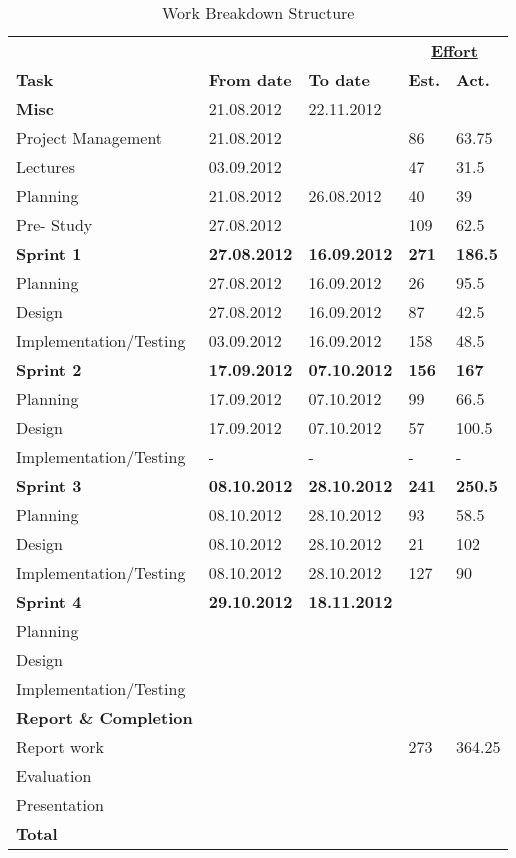 

\begin{table}


\begin{tabular}{ l|l|l|l|l } \hline
&	 &	 &\multicolumn{2}{c}{\underline{\textbf{Effort}}}	 \\
\textbf{Task}	 & \textbf{From date}	 & \textbf{To date}	 & \textbf{Est.} & \textbf{Act.}	 \\ \hline \hline
\textbf{Misc} & 21.08.2012 & 22.11.2012 & & \\ \hline
Project Management & 21.08.2012 & & 86 & 63.75 \\
Lectures & 03.09.2012 & & 47 & 31.5\\
Planning & 21.08.2012 & 26.08.2012 & 40 & 39 \\
Pre- Study &27.08.2012  & & 109 & 62.5\\ \hline
\bf{Sprint 1}	&\bf{27.08.2012} & \bf{16.09.2012} & \bf{271} & \textbf{186.5} \\ \hline
Planning & 27.08.2012 & 16.09.2012 & 26 & 95.5 \\
Design & 27.08.2012 & 16.09.2012 & 87 & 42.5\\
Implementation/Testing & 03.09.2012 & 16.09.2012 & 158 & 48.5\\ \hline
\bf{Sprint 2} & \bf{17.09.2012} & \bf{07.10.2012} & \bf{156} & \textbf{167} \\ \hline
Planning & 17.09.2012 & 07.10.2012 & 99 & 66.5\\
Design& 17.09.2012 & 07.10.2012 & 57 & 100.5\\
Implementation/Testing & - & - & - & -\\ \hline
\bf{Sprint 3}	 & \bf{08.10.2012} & \bf{28.10.2012} & \bf{241} & \textbf{250.5}\\ \hline
Planning & 08.10.2012 & 28.10.2012 & 93 & 58.5 \\
Design & 08.10.2012 & 28.10.2012 & 21 & 102\\
Implementation/Testing & 08.10.2012 & 28.10.2012 & 127 & 90\\ \hline
\bf{Sprint 4}	& \bf{29.10.2012} & \bf{18.11.2012} & \bf{}  &  \\ \hline
Planning & & &  &	 \\
Design& & & & \\
Implementation/Testing & & &  & \\ \hline
\textbf{Report \& Completion} & & & & \\ \hline
Report work & & & 273 & 364.25\\
Evaluation & & & & \\
Presentation && & & \\ \hline
\bf{Total} & & &\bf{}	& \\ \hline
\end{tabular}
\caption{Work Breakdown Structure} \label{table:wbs}
\end{table}
